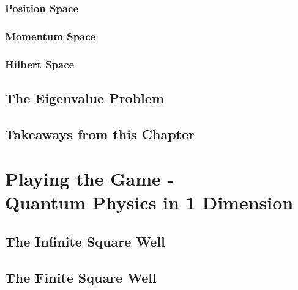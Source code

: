 \documentclass[12pt,letterpaper]{book}
\begin{document}

\subsection*{Position Space}



\subsection*{Momentum Space}


\subsection*{Hilbert Space}
 

\section{The Eigenvalue Problem}



\section{Takeaways from this Chapter}


\chapter{Playing the Game - \\ Quantum Physics in 1 Dimension}


\section{The Infinite Square Well}



\section{The Finite Square Well}
\end{document}
